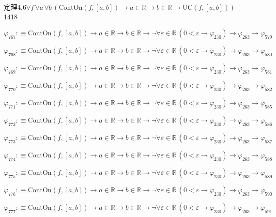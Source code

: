 \begin{fullproof}{定理4.6}{$\forall f\,\forall a\,\forall b\,(\mathrm{ContOn}(f,[a,b]) \to a \in \mathbb{R} \to b \in \mathbb{R} \to \mathrm{UC}(f,[a,b]))$}{1418}
\begin{abbrevlist}
\item $\varphi_{767} :\equiv \mathrm{ContOn}(f,[a,b]) \to a \in \mathbb{R} \to b \in \mathbb{R} \to \neg \forall \varepsilon \in \mathbb{R}\,(0 < \varepsilon \to \varphi_{230}) \to \varphi_{263} \to \varphi_{579}$
\item $\varphi_{768} :\equiv \mathrm{ContOn}(f,[a,b]) \to a \in \mathbb{R} \to b \in \mathbb{R} \to \neg \forall \varepsilon \in \mathbb{R}\,(0 < \varepsilon \to \varphi_{230}) \to \varphi_{263} \to \varphi_{580}$
\item $\varphi_{769} :\equiv \mathrm{ContOn}(f,[a,b]) \to a \in \mathbb{R} \to b \in \mathbb{R} \to \neg \forall \varepsilon \in \mathbb{R}\,(0 < \varepsilon \to \varphi_{230}) \to \varphi_{263} \to \varphi_{581}$
\item $\varphi_{770} :\equiv \mathrm{ContOn}(f,[a,b]) \to a \in \mathbb{R} \to b \in \mathbb{R} \to \neg \forall \varepsilon \in \mathbb{R}\,(0 < \varepsilon \to \varphi_{230}) \to \varphi_{263} \to \varphi_{582}$
\item $\varphi_{771} :\equiv \mathrm{ContOn}(f,[a,b]) \to a \in \mathbb{R} \to b \in \mathbb{R} \to \neg \forall \varepsilon \in \mathbb{R}\,(0 < \varepsilon \to \varphi_{230}) \to \varphi_{263} \to \varphi_{585}$
\item $\varphi_{772} :\equiv \mathrm{ContOn}(f,[a,b]) \to a \in \mathbb{R} \to b \in \mathbb{R} \to \neg \forall \varepsilon \in \mathbb{R}\,(0 < \varepsilon \to \varphi_{230}) \to \varphi_{263} \to \varphi_{586}$
\item $\varphi_{773} :\equiv \mathrm{ContOn}(f,[a,b]) \to a \in \mathbb{R} \to b \in \mathbb{R} \to \neg \forall \varepsilon \in \mathbb{R}\,(0 < \varepsilon \to \varphi_{230}) \to \varphi_{263} \to \varphi_{587}$
\item $\varphi_{774} :\equiv \mathrm{ContOn}(f,[a,b]) \to a \in \mathbb{R} \to b \in \mathbb{R} \to \neg \forall \varepsilon \in \mathbb{R}\,(0 < \varepsilon \to \varphi_{230}) \to \varphi_{263} \to \varphi_{588}$
\item $\varphi_{775} :\equiv \mathrm{ContOn}(f,[a,b]) \to a \in \mathbb{R} \to b \in \mathbb{R} \to \neg \forall \varepsilon \in \mathbb{R}\,(0 < \varepsilon \to \varphi_{230}) \to \varphi_{263} \to \varphi_{589}$
\item $\varphi_{776} :\equiv \mathrm{ContOn}(f,[a,b]) \to a \in \mathbb{R} \to b \in \mathbb{R} \to \neg \forall \varepsilon \in \mathbb{R}\,(0 < \varepsilon \to \varphi_{230}) \to \varphi_{263} \to \varphi_{590}$
\item $\varphi_{777} :\equiv \mathrm{ContOn}(f,[a,b]) \to a \in \mathbb{R} \to b \in \mathbb{R} \to \neg \forall \varepsilon \in \mathbb{R}\,(0 < \varepsilon \to \varphi_{230}) \to \varphi_{263} \to \varphi_{591}$

\end{abbrevlist}
\end{fullproof}
